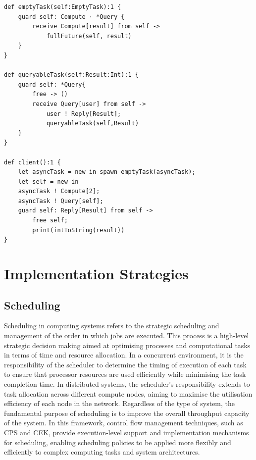 \documentclass{l4proj}
\begin{document}
\lstset{style=patstyle}
\begin{lstlisting}[caption={Implementing Concurrent Program for Asynchronous Task Processing and Result Querying}, label={lst:patexample2}]
def emptyTask(self:EmptyTask):1 {
    guard self: Compute · *Query {
        receive Compute[result] from self -> 
            fullFuture(self, result)
    }
}

def queryableTask(self:Result:Int):1 {
    guard self: *Query{
        free -> ()
        receive Query[user] from self ->
            user ! Reply[Result];
            queryableTask(self,Result)
    }
}

def client():1 {
    let asyncTask = new in spawn emptyTask(asyncTask);
    let self = new in 
    asyncTask ! Compute[2];
    asyncTask ! Query[self];
    guard self: Reply[Result] from self ->
        free self;
        print(intToString(result))
}

\end{lstlisting}

\section{Implementation Strategies}

\subsection{Scheduling}
Scheduling in computing systems refers to the strategic scheduling and management of the order in which jobs are executed. This process is a high-level strategic decision making aimed at optimising processes and computational tasks in terms of time and resource allocation. In a concurrent environment, it is the responsibility of the scheduler to determine the timing of execution of each task to ensure that processor resources are used efficiently while minimising the task completion time. In distributed systems, the scheduler's responsibility extends to task allocation across different compute nodes, aiming to maximise the utilisation efficiency of each node in the network. Regardless of the type of system, the fundamental purpose of scheduling is to improve the overall throughput capacity of the system. In this framework, control flow management techniques, such as CPS and CEK, provide execution-level support and implementation mechanisms for scheduling, enabling scheduling policies to be applied more flexibly and efficiently to complex computing tasks and system architectures.
\end{document}
